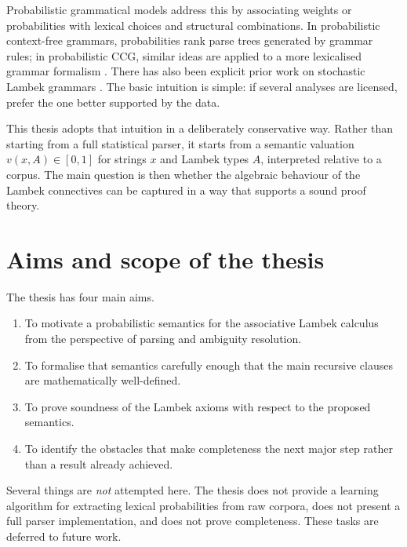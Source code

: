\documentclass[12pt,a4paper]{report}
\theoremstyle{definition}
\begin{document}
Probabilistic grammatical models address this by associating weights or probabilities with lexical
choices and structural combinations. In probabilistic context-free grammars, probabilities rank
parse trees generated by grammar rules; in probabilistic CCG, similar ideas are applied to a more
lexicalised grammar formalism \citep{ManningSchutze1999,ClarkCurran2007}. There has also been
explicit prior work on stochastic Lambek grammars \citep{BonfanteDeGroote2004}. The basic
intuition is simple: if several analyses are licensed, prefer the one better supported by the data.

This thesis adopts that intuition in a deliberately conservative way. Rather than starting from a
full statistical parser, it starts from a semantic valuation $v(x,A) \in [0,1]$ for strings $x$ and
Lambek types $A$, interpreted relative to a corpus. The main question is then whether the
algebraic behaviour of the Lambek connectives can be captured in a way that supports a
sound proof theory.

\section{Aims and scope of the thesis}
The thesis has four main aims.
\begin{enumerate}[label=(\roman*)]
    \item To motivate a probabilistic semantics for the associative Lambek calculus from the
    perspective of parsing and ambiguity resolution.
    \item To formalise that semantics carefully enough that the main recursive clauses are
    mathematically well-defined.
    \item To prove soundness of the Lambek axioms with respect to the proposed semantics.
    \item To identify the obstacles that make completeness the next major step rather than a result
    already achieved.
\end{enumerate}

Several things are \emph{not} attempted here. The thesis does not provide a learning algorithm for
extracting lexical probabilities from raw corpora, does not present a full parser implementation,
and does not prove completeness. These tasks are deferred to future work.
\end{document}
